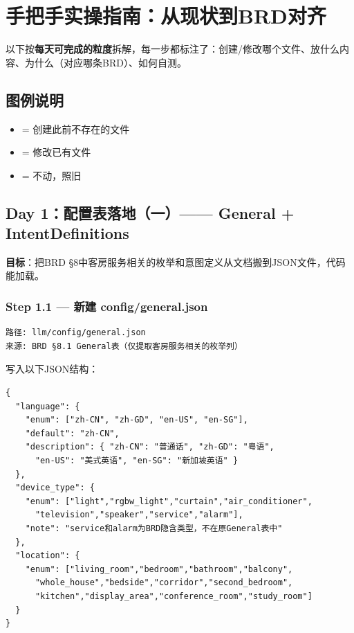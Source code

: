 \documentclass[12pt,a4paper]{ctexart}
\begin{document}
\newpage

\section{手把手实操指南：从现状到BRD对齐}

以下按\textbf{每天可完成的粒度}拆解，每一步都标注了：创建/修改哪个文件、放什么内容、为什么（对应哪条BRD）、如何自测。

\subsection*{图例说明}
\begin{itemize}
    \item {} = 创建此前不存在的文件
    \item {} = 修改已有文件
    \item {} = 不动，照旧
\end{itemize}

\subsection{Day 1：配置表落地（一）—— General + IntentDefinitions}

\textbf{目标}：把BRD §8中客房服务相关的枚举和意图定义从文档搬到JSON文件，代码能加载。

\subsubsection*{Step 1.1 — 新建 config/general.json}
\begin{verbatim}
路径: llm/config/general.json
来源: BRD §8.1 General表（仅提取客房服务相关的枚举列）
\end{verbatim}

写入以下JSON结构：

{\small
\begin{verbatim}
{
  "language": {
    "enum": ["zh-CN", "zh-GD", "en-US", "en-SG"],
    "default": "zh-CN",
    "description": { "zh-CN": "普通话", "zh-GD": "粤语",
      "en-US": "美式英语", "en-SG": "新加坡英语" }
  },
  "device_type": {
    "enum": ["light","rgbw_light","curtain","air_conditioner",
      "television","speaker","service","alarm"],
    "note": "service和alarm为BRD隐含类型，不在原General表中"
  },
  "location": {
    "enum": ["living_room","bedroom","bathroom","balcony",
      "whole_house","bedside","corridor","second_bedroom",
      "kitchen","display_area","conference_room","study_room"]
  }
}
\end{verbatim}
}
\end{document}
